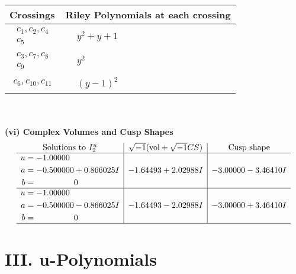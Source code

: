 \documentclass[1p]{elsarticle_modified}
\theoremstyle{definition}
\newcommand{\I}{\sqrt{-1}}
\begin{document}
\begin{tabular}{m{50pt}|m{274pt}}
Crossings & \hspace{64pt}Riley Polynomials at each crossing \\
\hline $$\begin{aligned}c_{1},c_{2},c_{4}\\c_{5}\end{aligned}$$&$\begin{aligned}
&y^2+y+1
\end{aligned}$\\
\hline $$\begin{aligned}c_{3},c_{7},c_{8}\\c_{9}\end{aligned}$$&$\begin{aligned}
&y^2
\end{aligned}$\\
\hline $$\begin{aligned}c_{6},c_{10},c_{11}\end{aligned}$$&$\begin{aligned}
&(y-1)^2
\end{aligned}$\\
\hline
\end{tabular}\\~\\
\newpage\flushleft \textbf{(vi) Complex Volumes and Cusp Shapes}
$$\begin{array}{c|c|c}  
\text{Solutions to }I^u_{2}& \I (\text{vol} + \sqrt{-1}CS) & \text{Cusp shape}\\
 \hline 
\begin{aligned}
u &= -1.00000\phantom{ +0.000000I} \\
a &= -0.500000 + 0.866025 I \\
b &= \phantom{-0.000000 } 0\end{aligned}
 & -1.64493 + 2.02988 I & -3.00000 - 3.46410 I \\ \hline\begin{aligned}
u &= -1.00000\phantom{ +0.000000I} \\
a &= -0.500000 - 0.866025 I \\
b &= \phantom{-0.000000 } 0\end{aligned}
 & -1.64493 - 2.02988 I & -3.00000 + 3.46410 I\\
 \hline 
 \end{array}$$\newpage
\newpage\renewcommand{\arraystretch}{1}
\centering \section*{ III. u-Polynomials}
\end{document}

